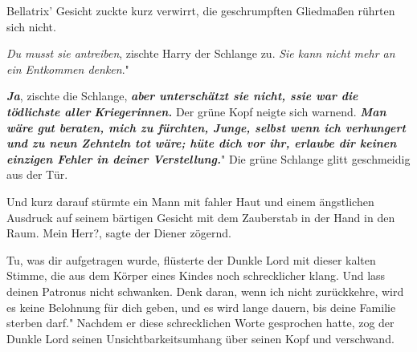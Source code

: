 Bellatrix' Gesicht zuckte kurz verwirrt, die geschrumpften Gliedmaßen rührten
sich nicht.

\glqq \emph{Du musst sie antreiben}\grqq{}, zischte Harry der Schlange zu. \glqq
\emph{Sie kann nicht mehr an ein Entkommen denken}."

\glqq \textbf{\emph{Ja}}\grqq{}, zischte die Schlange, \glqq \textbf{\emph{aber
unterschätzt sie nicht, ssie war die tödlichste aller
}}\textbf{\emph{Kriegerinnen.}}\grqq{} Der grüne Kopf neigte sich warnend. \glqq
\textbf{\emph{Man wäre gut beraten, mich zu fürchten, Junge, selbst wenn ich
verhungert und zu neun Zehnteln tot wäre; hüte dich vor ihr, erlaube dir keinen
einzigen Fehler in deiner Verstellung.}}" Die grüne Schlange glitt geschmeidig
aus der Tür.

Und kurz darauf stürmte ein Mann mit fahler Haut und einem ängstlichen Ausdruck
auf seinem bärtigen Gesicht mit dem Zauberstab in der Hand in den Raum. \glqq
Mein Herr?\grqq{}, sagte der Diener zögernd.

\glqq Tu, was dir aufgetragen wurde\grqq{}, flüsterte der Dunkle Lord mit dieser
kalten Stimme, die aus dem Körper eines Kindes noch schrecklicher klang. \glqq
Und lass deinen Patronus nicht schwanken. Denk daran, wenn ich nicht
zurückkehre, wird es keine Belohnung für dich geben, und es wird lange dauern,
bis deine Familie sterben darf." Nachdem er diese schrecklichen Worte gesprochen
hatte, zog der Dunkle Lord seinen Unsichtbarkeitsumhang über seinen Kopf und
verschwand.

